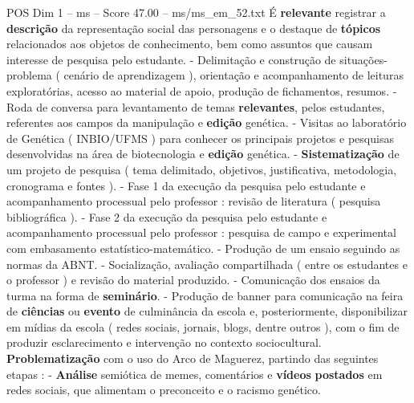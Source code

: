 \begin{textsample}{POS Dim 1 – ms – Score 47.00 – ms/ms\_em\_52.txt}
É \textbf{relevante} registrar a \textbf{descrição} da representação social das personagens e o destaque de \textbf{tópicos} relacionados aos objetos de conhecimento, bem como assuntos que causam interesse de pesquisa pelo estudante. - Delimitação e construção de situações-problema ( cenário de aprendizagem ), orientação e acompanhamento de leituras exploratórias, acesso ao material de apoio, produção de fichamentos, resumos. - Roda de conversa para levantamento de temas \textbf{relevantes}, pelos estudantes, referentes aos campos da manipulação e \textbf{edição} genética. - Visitas ao laboratório de Genética ( INBIO/UFMS ) para conhecer os principais projetos e pesquisas desenvolvidas na área de biotecnologia e \textbf{edição} genética. - \textbf{Sistematização} de um projeto de pesquisa ( tema delimitado, objetivos, justificativa, metodologia, cronograma e fontes ). - Fase 1 da execução da pesquisa pelo estudante e acompanhamento processual pelo professor : revisão de literatura ( pesquisa bibliográfica ). - Fase 2 da execução da pesquisa pelo estudante e acompanhamento processual pelo professor : pesquisa de campo e experimental com embasamento estatístico-matemático. - Produção de um ensaio seguindo as normas da ABNT. - Socialização, avaliação compartilhada ( entre os estudantes e o professor ) e revisão do material produzido. - Comunicação dos ensaios da turma na forma de \textbf{seminário}. - Produção de banner para comunicação na feira de \textbf{ciências} ou \textbf{evento} de culminância da escola e, posteriormente, disponibilizar em mídias da escola ( redes sociais, jornais, blogs, dentre outros ), com o fim de produzir esclarecimento e intervenção no contexto sociocultural. \textbf{Problematização} com o uso do Arco de Maguerez, partindo das seguintes etapas : - \textbf{Análise} semiótica de memes, comentários e \textbf{vídeos} \textbf{postados} em redes sociais, que alimentam o preconceito e o racismo genético.

\end{textsample}
